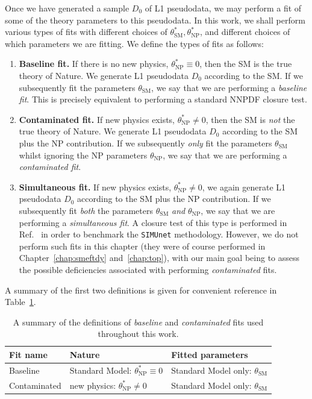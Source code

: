 \documentclass[withindex,glossary]{cam-thesis}
\begin{document}
Once we have generated a sample $D_0$ of L1 pseudodata, we may perform a fit of some of the theory parameters to this pseudodata. In this work, we shall perform various types of fits with different choices of $\theta_{\text{SM}}^*, \theta_{\text{NP}}^*$, and different choices of which parameters we are fitting. We define the types of fits as follows:
\begin{enumerate}[label = (\arabic*)]
\item \textbf{Baseline fit.} If there is no new physics, $\theta_{\text{NP}}^* \equiv 0$, then the SM is the true theory of Nature. We generate L1 pseudodata $D_0$ according to the SM. If we subsequently fit the parameters $\theta_{\text{SM}}$, we say that we are performing a \textit{baseline fit}. This is precisely equivalent to performing a standard NNPDF closure test.
\item \textbf{Contaminated fit.} If new physics exists, $\theta_{\text{NP}}^* \neq 0$, then the SM is \textit{not} the true theory of Nature. We generate L1 pseudodata $D_0$ according to the SM plus the NP contribution. If we subsequently \textit{only} fit the parameters $\theta_{\text{SM}}$ whilst ignoring the NP parameters $\theta_{\text{NP}}$, we say that we are performing a \textit{contaminated fit}.
\item \textbf{Simultaneous fit.} If new physics exists, $\theta_{\text{NP}}^* \neq 0$, we again generate L1 pseudodata $D_0$ according to the SM plus the NP contribution. If we subsequently fit \textit{both} the parameters $\theta_{\text{SM}}$ \textit{and} $\theta_{\text{NP}}$, we say that we are performing a \textit{simultaneous fit}. A closure test of this type is performed in Ref.~\cite{Iranipour:2022iak} in order to benchmark the {\tt SIMUnet} methodology. However, we do not perform such fits in this chapter (they were of course performed in Chapter~\ref{chap:smeftdy} and~\ref{chap:top}), with our main goal being to assess the possible deficiencies associated with performing \textit{contaminated} fits.
\end{enumerate}
A summary of the first two definitions is given for convenient reference in Table~\ref{table:definition}.

\begin{table}
  \centering
  \begin{tabular}{l|l|l}
    \toprule
    {\bf Fit name} & {\bf Nature}  & {\bf Fitted parameters}\\
    \midrule
    Baseline & Standard Model: $\theta_{\text{NP}}^* \equiv 0$ & Standard Model only: $\theta_{\text{SM}}$ \\
    Contaminated & new physics: $\theta_{\text{NP}}^* \neq 0$ & Standard Model only: $\theta_{\text{SM}}$\\
    \bottomrule
    \end{tabular}
   \caption{\label{table:definition} A summary of the definitions of \textit{baseline} and \textit{contaminated} fits used throughout this work.}
  \end{table}
\end{document}
